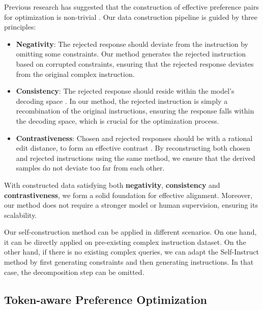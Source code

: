 \vspace{-1mm}

Previous research has suggested that the construction of effective preference pairs for optimization is non-trivial \cite{ivison2024unpackingdpoppodisentangling}. Our data construction pipeline is guided by three principles:

\vspace{-1mm}

\begin{itemize}[itemsep=1mm, parsep=0pt]
    \item \textbf{Negativity}: The rejected response should deviate from the instruction by omitting some constraints. Our method generates the rejected instruction based on corrupted constraints, ensuring that the rejected response deviates from the original complex instruction.
    \item \textbf{Consistency}: The rejected response should reside within the model's decoding space \cite{guo2024directlanguagemodelalignment}. In our method, the rejected instruction is simply a recombination of the original instructions, ensuring the response falls within the decoding space, which is crucial for the optimization process.
    \item \textbf{Contrastiveness}: Chosen and rejected responses should be with a rational edit distance, to form an effective contrast \cite{jiang2024bridgingmodelingcorrelationspairwise}. By reconstructing both chosen and rejected instructions using the same method, we ensure that the derived samples do not deviate too far from each other.
\end{itemize}

\vspace{-2mm}

With constructed data satisfying both \textbf{negativity}, \textbf{consistency} and \textbf{contrastiveness}, we form a solid foundation for effective alignment. Moreover, our method does not require a stronger model or human supervision, ensuring its scalability.

Our self-construction method can be applied in different scenarios. On one hand, it can be directly applied on pre-existing complex instruction dataset. On the other hand, if there is no existing complex queries, we can adapt the Self-Instruct \cite{selfinstruct} method by first generating constraints and then generating instructions. In that case, the decomposition step can be omitted.

\subsection{Token-aware Preference Optimization}

